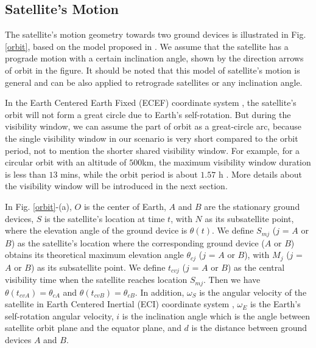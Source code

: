 \documentclass{IEEEtaes}
\theoremstyle{plain}
\begin{document}
\subsection{Satellite's Motion}
The satellite's motion geometry towards two ground devices is illustrated in Fig. \ref{orbit}, based on the model proposed in \cite{ali1998doppler}. We assume that the satellite has a prograde motion with a certain inclination angle, shown by the direction arrows of orbit in the figure. It should be noted that this model of satellite's motion is general and can be also applied to retrograde satellites or any inclination angle.

In the Earth Centered Earth Fixed (ECEF) coordinate system \cite{popescu2014pixel}, the satellite's orbit will not form a great circle due to Earth's self-rotation. But during the visibility window, we can assume the part of orbit as a great-circle arc, because the single visibility window in our scenario is very short compared to the orbit period, not to mention the shorter shared visibility window. For example, for a circular orbit with an altitude of $500$km, the maximum visibility window duration is less than $13$ \rm{mins}, while the orbit period is about $1.57$ \rm{h} \cite{ali1998doppler}. More details about the visibility window will be introduced in the next section. 

In Fig. \ref{orbit}-(a), $O$ is the center of Earth, $A$ and $B$ are the stationary ground devices, $S$ is the satellite's location at time $t$, with $N$ as its subsatellite point, where the elevation angle of the ground device is $\theta(t)$. We define $S_{mj}$ ($j$ = $A$ or $B$) as the satellite's location where the corresponding ground device ($A$ or $B$) obtains its theoretical maximum elevation angle $\theta_{c\!j}$ ($j$ = $A$ or $B$), with $M_{j}$ ($j$ = $A$ or $B$) as its subsatellite point. We define $t_{c\!v\!j}$ ($j$ = $A$ or $B$) as the central visibility time when the satellite reaches location $S_{mj}$. Then we have $\theta(t_{c\!v\!A})=\theta_{c\!A}$ and $\theta(t_{c\!v\!B})=\theta_{c\!B}$. In addition, $\omega_S$ is the angular velocity of the satellite in Earth Centered Inertial (ECI) coordinate system \cite{popescu2014pixel}, $\omega_E$ is the Earth's self-rotation angular velocity, $i$ is the inclination angle which is the angle between satellite orbit plane and the equator plane, and $d$ is the distance between ground devices $A$ and $B$.
\end{document}
